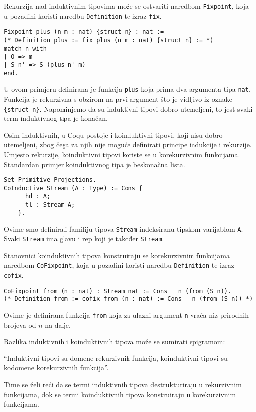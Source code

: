 Rekurzija nad induktivnim tipovima može se ostvariti naredbom \texttt{Fixpoint}, koja u pozadini koristi naredbu \texttt{Definition} te izraz \texttt{fix}.
\begin{verbatim}
Fixpoint plus (n m : nat) {struct n} : nat :=
(* Definition plus := fix plus (n m : nat) {struct n} := *)
match n with
| O => m
| S n' => S (plus n' m)
end.
\end{verbatim}
U ovom primjeru definirana je funkcija \texttt{plus} koja prima dva argumenta tipa \texttt{nat}.
Funkcija je rekurzivna s obzirom na prvi argument što je vidljivo iz oznake  \texttt{\{struct n\}}.
Napominjemo da su induktivni tipovi dobro utemeljeni, to jest svaki term induktivnog tipa je konačan.

Osim induktivnih, u Coqu postoje i koinduktivni tipovi, koji nisu dobro utemeljeni,
zbog čega za njih nije moguće definirati principe indukcije i rekurzije.
Umjesto rekurzije, koinduktivni tipovi koriste se u korekurzivnim funkcijama.
Standardan primjer koinduktivnog tipa je beskonačna lista.
\begin{verbatim}
Set Primitive Projections.
CoInductive Stream (A : Type) := Cons {
      hd : A;
      tl : Stream A;
    }.
\end{verbatim}
Ovime smo definirali familiju tipova \texttt{Stream} indeksiranu tipskom varijablom \texttt{A}.
Svaki \texttt{Stream} ima glavu i rep koji je također \texttt{Stream}.

Stanovnici koinduktivnih tipova konstruiraju se korekurzivnim funkcijama naredbom \texttt{CoFixpoint}, koja u pozadini koristi naredbu \texttt{Definition} te izraz \texttt{cofix}.
\begin{verbatim}
CoFixpoint from (n : nat) : Stream nat := Cons _ n (from (S n)).
(* Definition from := cofix from (n : nat) := Cons _ n (from (S n)) *)
\end{verbatim}
\noindent Ovime je definirana funkcija \texttt{from} koja za ulazni argument \texttt{n} vraća niz prirodnih brojeva od \(n\) na dalje.

Razlika induktivnih i koinduktivnih tipova može se sumirati epigramom:
\begin{displayquote}
  \enquote{Induktivni tipovi su domene rekurzivnih funkcija, koinduktivni tipovi su kodomene korekurzivnih funkcija}.
\end{displayquote}
\noindent Time se želi reći da se termi induktivnih tipova destrukturiraju u rekurzivnim funkcijama,
dok se termi koinduktivnih tipova konstruiraju u korekurzivnim funkcijama.

